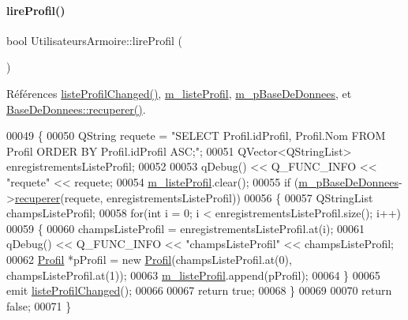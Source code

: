 \paragraph{\texorpdfstring{lire\+Profil()}{lireProfil()}}
{\footnotesize\ttfamily bool Utilisateurs\+Armoire\+::lire\+Profil (\begin{DoxyParamCaption}{ }\end{DoxyParamCaption})}



Références \hyperlink{class_utilisateurs_armoire_a8208260671720fdbd5d6f13b0e6827f2}{liste\+Profil\+Changed()}, \hyperlink{class_utilisateurs_armoire_a0687ace99585d71b2636feaf2163b905}{m\+\_\+liste\+Profil}, \hyperlink{class_utilisateurs_armoire_ac43b4894f5036117d044ad2d22b09318}{m\+\_\+p\+Base\+De\+Donnees}, et \hyperlink{class_base_de_donnees_a77539baad389f5acf754cd2cd452403e}{Base\+De\+Donnees\+::recuperer()}.


\begin{DoxyCode}
00049 \{
00050     QString requete = \textcolor{stringliteral}{"SELECT Profil.idProfil, Profil.Nom FROM Profil ORDER BY Profil.idProfil ASC;"};
00051     QVector<QStringList> enregistrementsListeProfil;
00052 
00053     qDebug() << Q\_FUNC\_INFO << \textcolor{stringliteral}{"requete"} << requete;
00054     \hyperlink{class_utilisateurs_armoire_a0687ace99585d71b2636feaf2163b905}{m\_listeProfil}.clear();
00055     \textcolor{keywordflow}{if} (\hyperlink{class_utilisateurs_armoire_ac43b4894f5036117d044ad2d22b09318}{m\_pBaseDeDonnees}->\hyperlink{class_base_de_donnees_a77539baad389f5acf754cd2cd452403e}{recuperer}(requete, enregistrementsListeProfil))
00056     \{
00057         QStringList champsListeProfil;
00058         \textcolor{keywordflow}{for}(\textcolor{keywordtype}{int} i = 0; i < enregistrementsListeProfil.size(); i++)
00059         \{
00060             champsListeProfil = enregistrementsListeProfil.at(i);
00061             qDebug() << Q\_FUNC\_INFO << \textcolor{stringliteral}{"champsListeProfil"} << champsListeProfil;
00062             \hyperlink{class_profil}{Profil} *pProfil = \textcolor{keyword}{new} \hyperlink{class_profil}{Profil}(champsListeProfil.at(0), champsListeProfil.at(1));
00063             \hyperlink{class_utilisateurs_armoire_a0687ace99585d71b2636feaf2163b905}{m\_listeProfil}.append(pProfil);
00064         \}
00065         emit \hyperlink{class_utilisateurs_armoire_a8208260671720fdbd5d6f13b0e6827f2}{listeProfilChanged}();
00066 
00067         \textcolor{keywordflow}{return} \textcolor{keyword}{true};
00068     \}
00069 
00070     \textcolor{keywordflow}{return} \textcolor{keyword}{false};
00071 \}
\end{DoxyCode}
\mbox{\label{class_utilisateurs_armoire_ae8cbb67d285658aadff801e64f43fd97}} 
